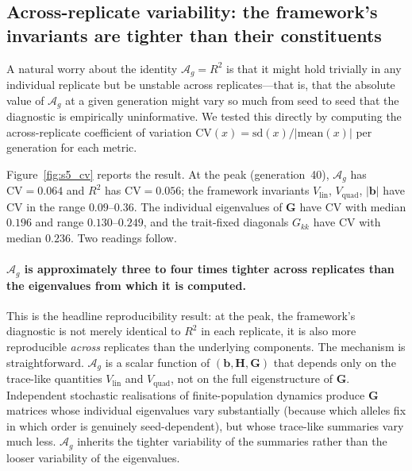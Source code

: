 \documentclass[9pt,twocolumn,twoside,lineno]{gsajnl}
\newcommand{\vect}[1]{\boldsymbol{#1}}
\newcommand{\mat}[1]{\mathbf{#1}}
\newcommand{\Ag}{\ensuremath{\mathcal{A}_{g}}\xspace}
\newcommand{\Vlin}{\ensuremath{V_{\text{lin}}}\xspace}
\newcommand{\Vquad}{\ensuremath{V_{\text{quad}}}\xspace}
\begin{document}
\subsection*{Across-replicate variability: the framework's invariants are tighter than their constituents}

A natural worry about the identity \mbox{$\Ag = R^2$} is that it might hold trivially in any individual replicate but be unstable across replicates---that is, that the absolute value of \Ag at a given generation might vary so much from seed to seed that the diagnostic is empirically uninformative. We tested this directly by computing the across-replicate coefficient of variation \mbox{$\mathrm{CV}(x) = \mathrm{sd}(x)/|\mathrm{mean}(x)|$} per generation for each metric.

Figure~\ref{fig:s5_cv} reports the result. At the peak (generation~40), \Ag has \mbox{$\mathrm{CV}=0.064$} and $R^2$ has \mbox{$\mathrm{CV}=0.056$}; the framework invariants $\Vlin$, $\Vquad$, $|\vect{b}|$ have CV in the range $0.09$--$0.36$. The individual eigenvalues of $\mat{G}$ have CV with median $0.196$ and range $0.130$--$0.249$, and the trait-fixed diagonals $G_{kk}$ have CV with median $0.236$. Two readings follow.

\paragraph{\Ag is approximately three to four times tighter across replicates than the eigenvalues from which it is computed.} 
This is the headline reproducibility result: at the peak, the framework's diagnostic is not merely identical to $R^2$ in each replicate, it is also more reproducible \emph{across} replicates than the underlying components. The mechanism is straightforward. \Ag is a scalar function of \mbox{$(\vect{b},\mat{H},\mat{G})$} that depends only on the trace-like quantities $\Vlin$ and $\Vquad$, not on the full eigenstructure of $\mat{G}$. Independent stochastic realisations of finite-population dynamics produce $\mat{G}$ matrices whose individual eigenvalues vary substantially (because which alleles fix in which order is genuinely seed-dependent), but whose trace-like summaries vary much less. \Ag inherits the tighter variability of the summaries rather than the looser variability of the eigenvalues.
\end{document}
